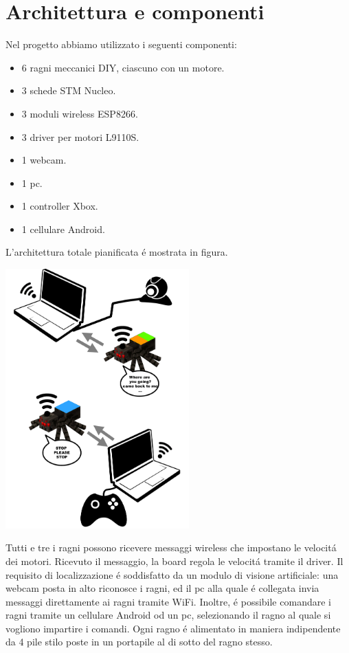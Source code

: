 \documentclass [11pt ,a4paper]{report}
\begin{document}
\chapter{Architettura e componenti}

Nel progetto abbiamo utilizzato i seguenti componenti:
\begin{itemize}
\item 6 ragni meccanici DIY, ciascuno con un motore.
\item 3 schede STM Nucleo.
\item 3 moduli wireless ESP8266.
\item 3 driver per motori L9110S.
\item 1 webcam.
\item 1 pc.
\item 1 controller Xbox.
\item 1 cellulare Android.
\end{itemize}

L'architettura totale pianificata \'e mostrata in figura. 

\begin{center}
\includegraphics[keepaspectratio, width=200pt]{Images/Infographic.png}
\end{center}

Tutti e tre i ragni possono ricevere messaggi wireless che impostano le velocit\'a dei motori. Ricevuto il messaggio, la board regola le velocit\'a tramite il driver. Il requisito di localizzazione \'e soddisfatto da un modulo di visione artificiale: una webcam posta in alto riconosce i ragni, ed il pc alla quale \'e collegata invia messaggi direttamente ai ragni tramite WiFi. Inoltre, \'e possibile comandare i ragni tramite un cellulare Android od un pc, selezionando il ragno al quale si vogliono impartire i comandi. Ogni ragno \'e alimentato in maniera indipendente da 4 pile stilo poste in un portapile al di sotto del ragno stesso.
\end{document}
